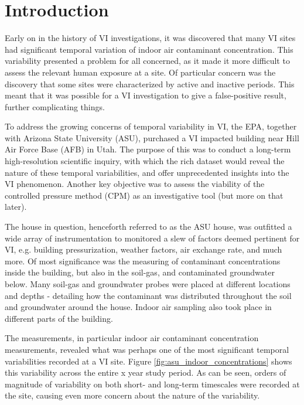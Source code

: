 \section{Introduction}\label{chp4:intro}

Early on in the history of VI investigations, it was discovered that many VI sites had significant temporal variation of indoor air contaminant concentration.
This variability presented a problem for all concerned, as it made it more difficult to assess the relevant human exposure at a site.
Of particular concern was the discovery that some sites were characterized by active and inactive periods.
This meant that it was possible for a VI investigation to give a false-positive result, further complicating things.\par

To address the growing concerns of temporal variability in VI, the EPA, together with Arizona State University (ASU), purchased a VI impacted building near Hill Air Force Base (AFB) in Utah.
The purpose of this was to conduct a long-term high-resolution scientific inquiry, with which the rich dataset would reveal the nature of these temporal variabilities, and offer unprecedented insights into the VI phenomenon.
Another key objective was to assess the viability of the controlled pressure method (CPM) as an investigative tool (but more on that later).\par

The house in question, henceforth referred to as the ASU house, was outfitted a wide array of instrumentation to monitored a slew of factors deemed pertinent for VI, e.g. building pressurization, weather factors, air exchange rate, and much more.
Of most significance was the measuring of contaminant concentrations inside the building, but also in the soil-gas, and contaminated groundwater below.
Many soil-gas and groundwater probes were placed at different locations and depths - detailing how the contaminant was distributed throughout the soil and groundwater around the house.
Indoor air sampling also took place in different parts of the building.\par

The measurements, in particular indoor air contaminant concentration measurements, revealed what was perhaps one of the most significant temporal variabilities recorded at a VI site.
Figure \ref{fig:asu_indoor_concentrations} shows this variability across the entire x year study period. %
As can be seen, orders of magnitude of variability on both short- and long-term timescales were recorded at the site, causing even more concern about the nature of the variability.\par


